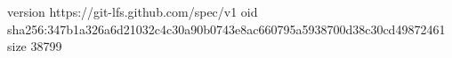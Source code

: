 version https://git-lfs.github.com/spec/v1
oid sha256:347b1a326a6d21032c4c30a90b0743e8ac660795a5938700d38c30cd49872461
size 38799
